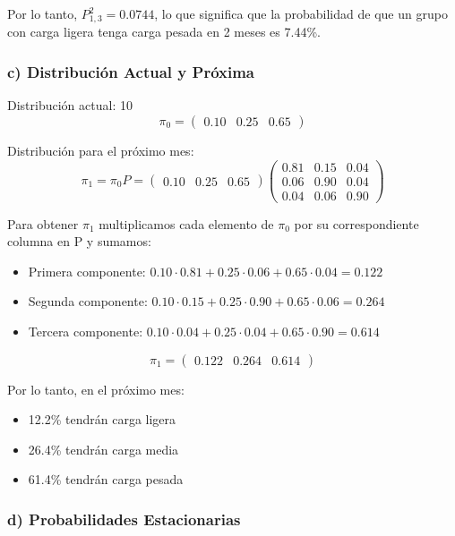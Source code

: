 \documentclass[12pt]{article}
\begin{document}
Por lo tanto, $P^2_{1,3} = 0.0744$, lo que significa que la probabilidad de que un grupo con carga ligera tenga carga pesada en 2 meses es 7.44\%.

\subsubsection{c) Distribución Actual y Próxima}

Distribución actual: 10%
\[
\pi_0 = \begin{pmatrix} 0.10 & 0.25 & 0.65 \end{pmatrix}
\]

Distribución para el próximo mes:
\[
\pi_1 = \pi_0 P = \begin{pmatrix} 0.10 & 0.25 & 0.65 \end{pmatrix} \begin{pmatrix}
0.81 & 0.15 & 0.04 \\
0.06 & 0.90 & 0.04 \\
0.04 & 0.06 & 0.90
\end{pmatrix}
\]

Para obtener $\pi_1$ multiplicamos cada elemento de $\pi_0$ por su correspondiente columna en P y sumamos:

\begin{itemize}
    \item Primera componente: $0.10 \cdot 0.81 + 0.25 \cdot 0.06 + 0.65 \cdot 0.04 = 0.122$
    \item Segunda componente: $0.10 \cdot 0.15 + 0.25 \cdot 0.90 + 0.65 \cdot 0.06 = 0.264$
    \item Tercera componente: $0.10 \cdot 0.04 + 0.25 \cdot 0.04 + 0.65 \cdot 0.90 = 0.614$
\end{itemize}

\[
\pi_1 = \begin{pmatrix} 0.122 & 0.264 & 0.614 \end{pmatrix}
\]

Por lo tanto, en el próximo mes:
\begin{itemize}
    \item 12.2\% tendrán carga ligera
    \item 26.4\% tendrán carga media  
    \item 61.4\% tendrán carga pesada
\end{itemize}

\subsubsection{d) Probabilidades Estacionarias}
\end{document}
